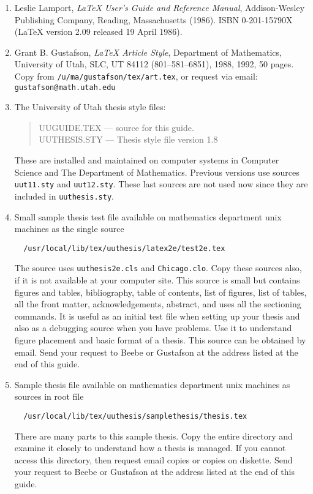\begin{enumerate}
\item Leslie Lamport, {\em \LaTeX{} User's Guide and Reference Manual},
Addison-Wesley Publishing Company, Reading, Massachusetts (1986). ISBN
0-201-15790X (\LaTeX{} version 2.09 released 19 April 1986).

\item Grant B. Gustafson, {\em \LaTeX{} Article Style}, Department of
Mathematics, University of Utah, SLC, UT 84112 (801--581--6851), 1988,
1992, 50 pages. Copy from {\tt /u/ma/gustafson/tex/art.tex}, or request
via email:
{\tt gustafson@math.utah.edu}

\item The University of Utah thesis style files:
\begin{quote}
UUGUIDE.TEX    --- source for this guide. \\
UUTHESIS.STY   --- Thesis style file version 1.8
\end{quote}
These are installed and maintained on computer systems in Computer
Science and The Department of Mathematics. Previous versions use sources
{\tt uut11.sty} and {\tt uut12.sty}. These last sources are not used now
since they are included in {\tt uuthesis.sty}.

\item Small sample thesis test file available on mathematics department
unix machines as the single source

\verb"  /usr/local/lib/tex/uuthesis/latex2e/test2e.tex"

The source uses {\tt uuthesis2e.cls} and {\tt Chicago.clo}. Copy these sources
also, if it is not
available at your computer site. This source is small but contains
figures and tables, bibliography, table of contents, list of figures,
list of tables, all the front matter, acknowledgements, abstract, and
uses all the sectioning commands. It is useful as an initial test file
when setting up your thesis and also as a debugging source when you have
problems. Use it to understand figure placement and basic format of a
thesis. This source can be obtained by email. Send your request to Beebe
or Gustafson at the address listed at the end of this guide.

\item Sample thesis file available on mathematics department unix
machines as sources in root file

\verb"  /usr/local/lib/tex/uuthesis/samplethesis/thesis.tex"

There are many parts to this sample thesis. Copy the entire directory
and examine it closely to understand how a thesis is managed. If you
cannot access this directory, then request email copies or copies on
diskette. Send your request to Beebe or Gustafson at the address listed
at the end of this guide.


\end{enumerate}
